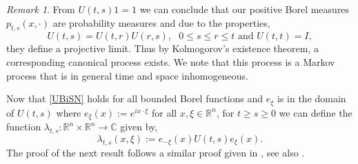 \documentclass[a4paper, 12pt]{report}
\theoremstyle{remark}
\newtheorem{remark}[theorem]{Remark}
\theoremstyle{definition}
\begin{document}
\begin{remark}
From $U(t, s)1 = 1$ we can conclude that our positive Borel measures $p_{t, s}(x, \cdot)$ are probability measures and due to the properties,
$$
U(t, s) = U(t, r)U(r, s), \text{ } 0 \le s \le r \le t \text{ and } U(t, t) = I,
$$
they define a projective limit.  Thus by Kolmogorov's existence theorem, a corresponding canonical process exists.  We note that this process is a Markov process that is in general time and space inhomogeneous.
\end{remark}

Now that \eqref{UBiSN} holds for all bounded Borel functions and $e_\xi$ is in the domain of $U(t, s)$ where $e_\xi(x) := e^{ix\cdot\xi}$ for all $x, \xi \in \mathbb{R}^n$, for $t \ge s \ge 0$ we can define the function $\lambda_{t, s} : \mathbb{R}^n \times \mathbb{R}^n \to \mathbb{C}$ given by,
\begin{equation}
\lambda_{t, s}(x, \xi) := e_{-\xi}(x)U(t, s)e_\xi(x).
\end{equation}
The proof of the next result follows a similar proof given in \cite{SymbolPaper}, see also \cite{Conservative}.
\end{document}
